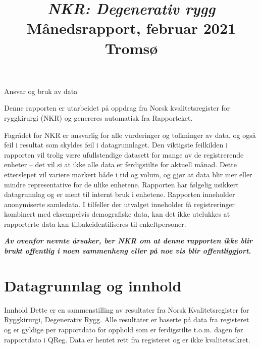 \documentclass[handout, xcolor=pdftex,dvipsnames,table]{beamer}  %
\begin{document}
\title[Rygg\\Tromsø \\\today]{\textit{NKR: Degenerativ rygg} \\
Månedsrapport, februar 2021 \\
Tromsø }
\maketitle


\begin{tiny}

\begin{frame}[fragile] {Ansvar og bruk av data}

Denne rapporten er utarbeidet på oppdrag fra Norsk kvalitetsregister for ryggkirurgi (NKR) og genereres automatisk
fra Rapporteket.

Fagrådet for NKR er ansvarlig for alle vurderinger og tolkninger av data, og også feil i resultat som skyldes feil i datagrunnlaget. Den viktigste feilkilden i rapporten vil trolig være ufullstendige datasett for mange av de registrerende enheter – det vil si at ikke alle data er ferdigstilte for aktuell månad. Dette etterslepet vil variere markert både i tid og volum, og gjør at data blir mer eller mindre representative for de ulike enhetene.
Rapporten har følgelig usikkert datagrunnlag og er ment til internt bruk i enhetene.
Rapporten inneholder anonymiserte samledata. I tilfeller der utvalget inneholder få
registreringer kombinert med eksempelvis demografiske data, kan det ikke utelukkes at rapporterte data kan tilbakeidentifiseres til enkeltpersoner.

\textit{\textbf{Av ovenfor nevnte årsaker, ber NKR om at denne rapporten ikke blir brukt
offentlig i noen sammenheng eller på noe vis blir offentliggjort.}}

\end{frame}


\section{Datagrunnlag og innhold}

\begin{frame}[fragile] {Innhold}
Dette er en sammenstilling av resultater  fra Norsk Kvalitetsregister for Ryggkirurgi, Degenerativ Rygg.
Alle resultater er baserte på data fra registeret og er gyldige per rapportdato for
opphold som er ferdigstilte t.o.m. dagen før rapportdato i QReg. Data er hentet rett fra registeret og er ikke kvalitetssikret.


\end{frame}
\end{tiny}
\end{document}
